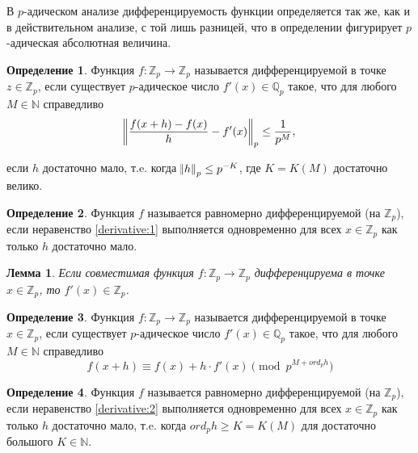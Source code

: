 \documentclass[master, och, diploma, times]{sty/SCWorks}
\theoremstyle{plain}
\newtheorem{lemma}{Лемма}[section]
\theoremstyle{definition}
\newtheorem{defn}{Определение}[section]
\numberwithin{equation}{section}
\begin{document}
В $p$-адическом анализе дифференцируемость функции определяется так же, как и в действительном анализе, с той лишь разницей, что в определении фигурирует $p$-адическая абсолютная величина.

\begin{defn}
Функция $f:\mathbb {Z}_p \rightarrow \mathbb {Z}_p$ называется дифференцируемой в точке $z \in \mathbb {Z}_p$, если существует $p$-адическое число $f'(x) \in \mathbb {Q}_p$ такое, что для любого $M \in \mathbb {N}$ справедливо
\begin{equation} \label{derivative:1}
	\norm{\frac{f(x+h)-f(x)}{h} - f'(x)}_p \le \frac{1}{p^M},
\end{equation}

\noindent если $h$ достаточно мало, т.e. когда $\norm{h}_p \le p^{-K}$, где $K=K(M)$ достаточно велико.
\end{defn}

\begin{defn}
Функция $f$ называется равномерно дифференцируемой (на $\mathbb {Z}_p$), если неравенство \eqref{derivative:1} выполняется одновременно для всех $x \in \mathbb {Z}_p$ как только $h$ достаточно мало. \cite{bib:analysis:anashin:en}
\end{defn}

\begin{lemma}
Если совместимая функция $f:\mathbb {Z}_p \rightarrow \mathbb {Z}_p$ дифференцируема в точке $x \in \mathbb {Z}_p$, то $f'(x) \in \mathbb {Z}_p$.
\end{lemma}

\begin{defn}
Функция $f:\mathbb {Z}_p \rightarrow \mathbb {Z}_p$ называется дифференцируемой в точке $x \in \mathbb {Z}_p$, если существует $p$-адическое число $f'(x) \in \mathbb {Q}_p$ такое, что для любого $M \in \mathbb {N}$ справедливо
\begin{equation} \label{derivative:2}
	f(x+h) \equiv f(x) + h \cdot f'(x) \pmod p^{M + ord_p h}
\end{equation}
\end{defn}

\begin{defn}
Функция $f$ называется равномерно дифференцируемой (на $\mathbb {Z}_p$), если неравенство \eqref{derivative:2} выполняется одновременно для всех $x \in \mathbb {Z}_p$ как только $h$ достаточно мало, т.e. когда $ord_p h \ge K=K(M)$ для достаточно большого $K \in \mathbb {N}$.\cite{bib:analisys:vv}
\end{defn}
\end{document}
